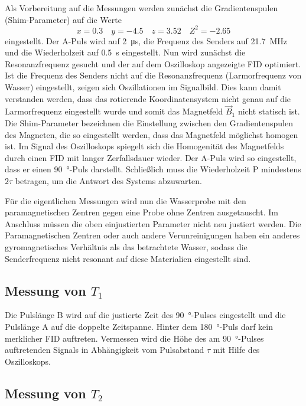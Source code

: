 Als Vorbereitung auf die Messungen werden zunächst die Gradientenspulen (Shim-Parameter)
auf die Werte
\begin{equation*}
  x = \num{+0.3} \quad y = \num{-4.5} \quad z = \num{+3.52} \quad Z^2 = \num{-2.65}
\end{equation*}
eingestellt.
Der A-Puls wird auf \SI{2}{\micro\second},
die Frequenz des Senders auf \SI{21.7}{\mega\hertz}
und die Wiederholzeit auf \SI{0.5}{\second} eingestellt.
Nun wird zunächst die Resonanzfrequenz gesucht und der auf dem Oszilloskop
angezeigte FID optimiert.
Ist die Frequenz des Senders nicht auf die Resonanzfrequenz (Larmorfrequenz von Wasser)
eingestellt, zeigen sich Oszillationen im Signalbild.
Dies kann damit verstanden werden, dass das rotierende Koordinatensystem nicht
genau auf die Larmorfrequenz eingestellt wurde und somit das Magnetfeld $\vec{B}_1$
nicht statisch ist.
Die Shim-Parameter bezeichnen die Einstellung zwischen den Gradientenspulen des
Magneten, die so eingestellt werden, dass das Magnetfeld möglichst homogen ist.
Im Signal des Oszilloskops spiegelt sich die Homogenität des Magnetfelds durch
einen FID mit langer Zerfallsdauer wieder.
Der A-Puls wird so eingestellt, dass er einen \SI{90}{\degree}-Puls darstellt.
Schließlich muss die Wiederholzeit P mindestens $2 \tau$ betragen, um die
Antwort des Systems abzuwarten.

Für die eigentlichen Messungen wird nun die Wasserprobe mit den paramagnetischen
Zentren gegen eine Probe ohne Zentren ausgetauscht.
Im Anschluss müssen die oben einjustierten Parameter nicht neu justiert werden.
Die Paramagnetischen Zentren oder auch andere Verunreinigungen haben ein anderes
gyromagnetisches Verhältnis als das betrachtete Wasser, sodass
die Senderfrequenz nicht resonant auf diese Materialien eingestellt sind.


\subsection{Messung von \texorpdfstring{$T_1$}{T1}}
\label{sec:DurchT1}

Die Pulslänge B wird auf die justierte Zeit des \SI{90}{\degree}-Pulses
eingestellt und die Pulslänge A auf die doppelte Zeitspanne.
Hinter dem \SI{180}{\degree}-Puls darf kein merklicher FID auftreten.
Vermessen wird die Höhe des am \SI{90}{\degree}-Pulses auftretenden
Signals in Abhängigkeit vom Pulsabstand $\tau$ mit Hilfe des Oszilloskops.


\subsection{Messung von \texorpdfstring{$T_2$}{T2}}
\label{sec:DurchT2}

